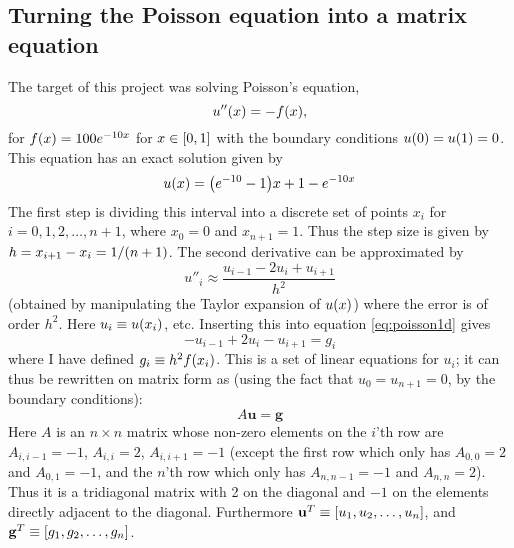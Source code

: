 \documentclass[a4paper,english]{article}
\renewcommand\vec{\mathbf}
\let\originalleft\left
\let\originalright\right
\renewcommand{\left}{\mathopen{}\mathclose\bgroup\originalleft}
\renewcommand{\right}{\aftergroup\egroup\originalright}
\begin{document}
\subsection{Turning the Poisson equation into a matrix equation}
The target of this project was solving Poisson's equation,
\begin{equation}
  u''\left(x\right) = -f\left(x\right)\text{,}
  \label{eq:poisson1d}
\end{equation}
for $f\left(x\right) = 100e^{-10x}$ for $x\in \left[0,1\right]$ with the boundary conditions $u\left(0\right) = u\left(1\right) = 0$. This equation has an exact solution given by \cite{assignment}
\begin{equation}
  u\left(x\right) = \left(e^{-10}-1\right)x+1-e^{-10x}
  \label{eq:u_exact}
\end{equation}
The first step is dividing this interval into a discrete set of points $x_i$ for $i = 0,1,2,\dots,n+1$, where $x_0 = 0$ and $x_{n+1} = 1$. Thus the step size is given by $h = x_{i+1}-x_i = 1/\left(n+1\right)$. The second derivative can be approximated by \cite{lecturenotes}
\begin{equation}
  u''_i \approx \frac{u_{i-1}-2u_i+u_{i+1}}{h^2}
\end{equation}
(obtained by manipulating the Taylor expansion of $u\left(x\right)$) where the error is of order $h^2$. Here $u_i \equiv u\left(x_i\right)$, etc. Inserting this into equation \ref{eq:poisson1d} gives
\begin{equation*}
  -u_{i-1}+2u_i-u_{i+1} = g_i
\end{equation*}
where I have defined $g_i \equiv h^2f\left(x_i\right)$. This is a set of linear equations for $u_i$; it can thus be rewritten on matrix form as (using the fact that $u_0 = u_{n+1} = 0$, by the boundary conditions):
\begin{equation}
  A \vec{u} = \vec{g}
  \label{eq:matrix_eq}
\end{equation}
Here $A$ is an $n\times n$ matrix whose non-zero elements on the $i$'th row are $A_{i,i-1} = -1$, $A_{i,i} =2$, $A_{i,i+1} = -1$ (except the first row which only has $A_{0,0} = 2$ and $A_{0,1} = -1$, and the $n$'th row which only has $A_{n,n-1} = -1$ and $A_{n,n} = 2$). Thus it is a tridiagonal matrix with 2 on the diagonal and $-1$ on the elements directly adjacent to the diagonal. Furthermore $\vec{u}^T \equiv \left[u_1,u_2,\dots,u_n\right]$, and $\vec{g}^T \equiv \left[g_1,g_2,\dots,g_n\right]$.
\end{document}
